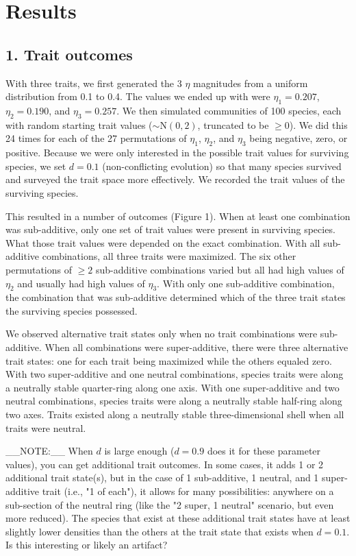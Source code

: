 \section*{Results}

\subsection*{1. Trait outcomes}


With three traits, we first generated the 3 $\eta$ magnitudes from a
uniform distribution from 0.1 to 0.4.
The values we ended up with were
$\eta_1 = 0.207$, $\eta_2 = 0.190$, and $\eta_3 = 0.257$.
We then simulated communities of 100 species, each with random starting
trait values ($\sim \text{N}(0, 2)$, truncated to be $\ge 0$).
We did this 24 times for each of the 27 permutations of
$\eta_1$, $\eta_2$, and $\eta_3$ being negative, zero, or positive.
Because we were only interested in the possible trait values for surviving
species, we set $d = 0.1$ (non-conflicting evolution) so that many species
survived and surveyed the trait space more effectively.
We recorded the trait values of the surviving species.


This resulted in a number of outcomes (Figure 1).
When at least one combination was sub-additive, only one set of trait
values were present in surviving species.
What those trait values were depended on the exact combination.
With all sub-additive combinations, all three traits were maximized.
The six other permutations of $\ge 2$ sub-additive combinations varied but
all had high values of $\eta_2$ and usually had high values of $\eta_3$.
With only one sub-additive combination, the combination that was sub-additive
determined which of the three trait states the surviving species possessed.


We observed alternative trait states only when no trait combinations
were sub-additive.
When all combinations were super-additive, there were three alternative
trait states: one for each trait being maximized while the others
equaled zero.
With two super-additive and one neutral combinations, species traits were
along a neutrally stable quarter-ring along one axis.
With one super-additive and two neutral combinations, species traits were
along a neutrally stable half-ring along two axes.
Traits existed along a neutrally stable three-dimensional shell when all
traits were neutral.



__NOTE:__ When $d$ is large enough ($d = 0.9$ does it for these parameter values),
you can get additional trait outcomes.
In some cases, it adds 1 or 2 additional trait state(s), but in the case
of 1 sub-additive, 1 neutral, and 1 super-additive trait (i.e., "1 of each"),
it allows for many possibilities:
anywhere on a sub-section of the neutral ring (like
the "2 super, 1 neutral" scenario, but even more reduced).
The species that exist at these additional trait states
have at least slightly lower densities than the others at the trait state
that exists when $d = 0.1$.
Is this interesting or likely an artifact?



